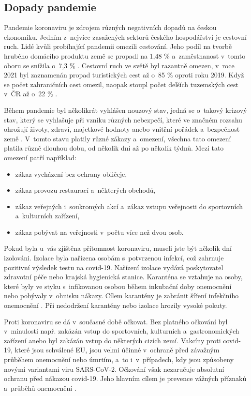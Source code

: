 \subsection{Dopady pandemie}
Pandemie koronaviru je zdrojem různých negativních dopadů na českou ekonomiku. Jedním z~nejvíce zasažených sektorů českého hospodářství je cestovní ruch. Lidé kvůli probíhající pandemii omezili cestování. Jeho podíl na tvorbě hrubého domácího produktu země se propadl na 1,48 \% a~zaměstnanost v~tomto oboru se snížila o~7,3 \% \cite{dopady-covid-cestruch}. Cestovní ruch ve světě byl razantně omezen, v~roce 2021 byl zaznamenán propad turistických cest až o~85 \% oproti roku 2019. Když se počet zahraničních cest omezil, naopak stoupl počet delších tuzemských cest v~ČR až o~22 \% \cite{dopady-covid-cestruch-2}.

Během pandemie byl několikrát vyhlášen nouzový stav, jedná se o~takový krizový stav, který se vyhlašuje při vzniku různých nebezpečí, které ve značném rozsahu ohrožují životy, zdraví, majetkové hodnoty anebo vnitřní pořádek a~bezpečnost země \cite{dopady-covid-nouzstav}. V~tomto stavu platily různé zákazy a~omezení, všechna tato omezení platila různě dlouhou dobu, od několik dní až po několik týdnů. Mezi tato omezení patří například:

\begin{itemize}
    \item zákaz vycházení bez ochrany obličeje,
    \item zákaz provozu restaurací a~některých obchodů,
    \item zákaz veřejných i~soukromých akcí a~zákaz vstupu veřejnosti do sportovních a~kulturních zařízení,
    \item zákaz pobývat na veřejnosti v~počtu více než dvou osob.
\end{itemize}

Pokud byla u~vás zjištěna přítomnost koronaviru, museli jste být několik dní izolováni. Izolace byla nařízena osobám s~potvrzenou infekcí, což zahrnuje pozitivní výsledek testu na covid-19. Nařízení izolace vydává poskytovatel zdravotní péče nebo krajská hygienická stanice. Karanténa se vztahuje na osoby, které byly ve styku s~infikovanou osobou během inkubační doby onemocnění nebo pobývaly v~ohnisku nákazy. Cílem karantény je zabránit šíření infekčního onemocnění \cite{dopady-covid-izolace}. Při nedodržení karantény nebo izolace hrozily vysoké pokuty.

Proti koronaviru se dá v~současné době očkovat. Bez platného očkování byl v~minulosti např. zakázán vstup do sportovních, kulturních a~gastronomických zařízení anebo byl zakázán vstup do některých cizích zemí. Vakcíny proti covid-19, které jsou schválené EU, jsou velmi účinné v~ochraně před závažným průběhem onemocnění nebo úmrtím, a~to i~v~případech, kdy jsou způsobeny novými variantami viru SARS-CoV-2. Očkování však nezaručuje absolutní ochranu před nákazou covid-19. Jeho hlavním cílem je prevence vážných příznaků a~průběhů onemocnění \cite{dopady-covid-vakciny}.

